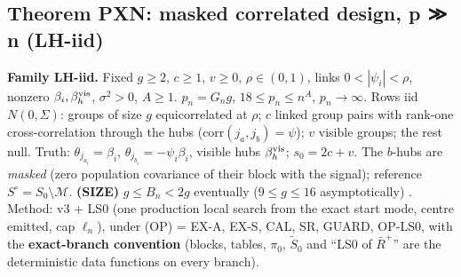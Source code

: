 \subsection{Theorem PXN: masked correlated design, p ≫ n (LH-iid)}\label{sec:pxn}
\textbf{Family LH-iid.} Fixed $g\ge2$, $c\ge1$, $v\ge0$, $\rho\in(0,1)$, links $0<|\psi_i|<\rho$, nonzero $\beta_i,\beta^{\rm vis}_h$, $\sigma^2>0$, $A\ge1$. $p_n=G_ng$, $18\le p_n\le n^A$, $p_n\to\infty$. Rows iid $N(0,\Sigma)$: groups of size $g$ equicorrelated at $\rho$; $c$ linked group pairs with rank-one cross-correlation through the hubs ($\mathrm{corr}(j_a,j_b)=\psi$); $v$ visible groups; the rest null. Truth: $\theta_{j_{a_i}}=\beta_i$, $\theta_{j_{b_i}}=-\psi_i\beta_i$, visible hubs $\beta^{\rm vis}_h$; $s_0=2c+v$. The $b$-hubs are \emph{masked} (zero population covariance of their block with the signal); reference $S^\circ=S_0\setminus\mathcal M$. \textbf{(SIZE)} $g\le B_n<2g$ eventually ($9\le g\le16$ asymptotically) . Method: v3 + LS0 (one production local search from the exact start mode, centre emitted, cap $\ell_n$), under (OP) = EX-A, EX-S, CAL, SR, GUARD, OP-LS0, with the \textbf{exact-branch convention} (blocks, tables, $\pi_0$, $\tilde{S}_0$ and ``LS0 of $\bar{R}^{+}$'' are the deterministic data functions on every branch).

